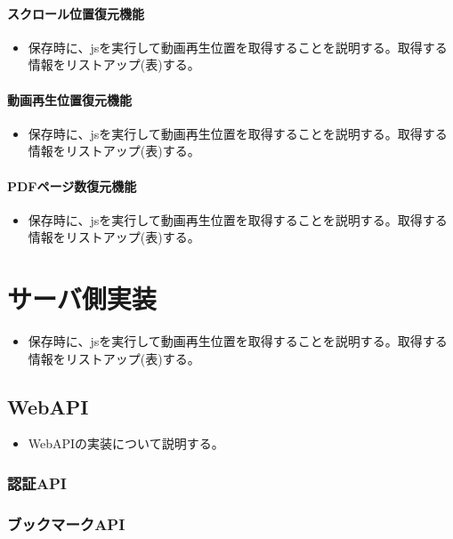 \paragraph{スクロール位置復元機能}
\begin{itemize}
  \item 保存時に、jsを実行して動画再生位置を取得することを説明する。取得する情報をリストアップ(表)する。
\end{itemize}

\paragraph{動画再生位置復元機能}
\begin{itemize}
  \item 保存時に、jsを実行して動画再生位置を取得することを説明する。取得する情報をリストアップ(表)する。
\end{itemize}

\paragraph{PDFページ数復元機能}
\begin{itemize}
  \item 保存時に、jsを実行して動画再生位置を取得することを説明する。取得する情報をリストアップ(表)する。
\end{itemize}

\section{サーバ側実装}
\begin{itemize}
  \item 保存時に、jsを実行して動画再生位置を取得することを説明する。取得する情報をリストアップ(表)する。
\end{itemize}

\subsection{WebAPI}
\begin{itemize}
  \item WebAPIの実装について説明する。
\end{itemize}

\subsubsection{認証API}
\subsubsection{ブックマークAPI}
